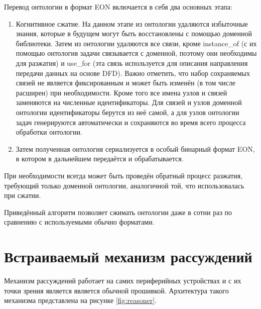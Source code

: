 Перевод онтологии в формат EON включается в себя два основных этапа:
\begin{enumerate}
	\item Когнитивное сжатие. 
	На данном этапе из онтологии удаляются избыточные знания, которые в будущем могут быть восстановлены с помощью доменной библиотеки.
	Затем из онтологии удаляются все связи, кроме instance{\_}of (с их помощью онтология задачи связывается с доменной, поэтому они необходимы для разжатия) и use{\_}for (эта связь используется для описания направления передачи данных на основе DFD).
	Важно отметить, что набор сохраняемых связей не является фиксированным и может быть изменён (в том числе расширен) при необходимости.
	Кроме того все имена узлов и связей заменяются на численные идентификаторы.
	Для связей и узлов доменной онтологии идентификаторы берутся из неё самой, а для узлов онтологии задач генерируются автоматически и сохраняются во время всего процесса обработки онтологии.
	\item Затем полученная онтология сериализуется в особый бинарный формат EON, в котором в дальнейшем передаётся и обрабатывается.
\end{enumerate}

При необходимости всегда может быть проведён обратный процесс разжатия, требующий только доменной онтологии, аналогичной той, что использовалась при сжатии.

Приведённый алгоритм позволяет сжимать онтологии даже в сотни раз по сравнению с используемыми обычно форматами.

\section{Встраиваемый механизм рассуждений}

Механизм рассуждений работает на самих периферийных устройствах и с их точки зрения является является обычной прошивкой.
Архитектура такого механизма представлена на рисунке \ref{fig:reasoner}\cite{incollection:onto-reasoning-on-mcu}.


